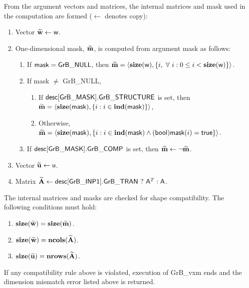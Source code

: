 From the argument vectors and matrices, the internal matrices and mask used in 
the computation are formed ($\leftarrow$ denotes copy):
\begin{enumerate}
	\item Vector ${\bf \widetilde{w}} \leftarrow {\sf w}$.

	\item One-dimensional mask, ${\bf \widetilde{m}}$, is computed from 
    argument {\sf mask} as follows:
	\begin{enumerate}
		\item If ${\sf mask} = {\sf GrB\_NULL}$, then ${\bf \widetilde{m}} = 
        \langle \bold{size}({\sf w}), \{i, \ \forall \ i : 0 \leq i < 
        \bold{size}({\sf w}) \} \rangle$.

		\item If {\sf mask} $\ne$ {\sf GrB\_NULL},  
        \begin{enumerate}
            \item If ${\sf desc[GrB\_MASK].GrB\_STRUCTURE}$ is set, then
            ${\bf \widetilde{m}} = 
            \langle \bold{size}({\sf mask}), \{i : i \in \bold{ind}({\sf mask}) \} \rangle$,
            \item Otherwise, ${\bf \widetilde{m}} = 
            \langle \bold{size}({\sf mask}), \{i : i \in \bold{ind}({\sf mask}) \wedge
            ({\sf bool}){\sf mask}(i) = {\sf true} \} \rangle$.
        \end{enumerate}

		\item	If ${\sf desc[GrB\_MASK].GrB\_COMP}$ is set, then 
        ${\bf \widetilde{m}} \leftarrow \neg {\bf \widetilde{m}}$.
	\end{enumerate}

	\item Vector ${\bf \widetilde{u}} \leftarrow {\sf u}$.

	\item Matrix ${\bf \widetilde{A}} \leftarrow {\sf desc[GrB\_INP1].GrB\_TRAN} \ ? \ {\sf A}^T : {\sf A}$.
\end{enumerate}

The internal matrices and masks are checked for shape compatibility. The following 
conditions must hold:
\begin{enumerate}
	\item $\bold{size}({\bf \widetilde{w}}) = \bold{size}({\bf \widetilde{m}})$.

	\item $\bold{size}({\bf \widetilde{w}}) = \bold{ncols}({\bf \widetilde{A}})$.

	\item $\bold{size}({\bf \widetilde{u}}) = \bold{nrows}({\bf \widetilde{A}})$.
\end{enumerate}
If any compatibility rule above is violated, execution of {\sf GrB\_vxm} ends and 
the dimension mismatch error listed above is returned.


